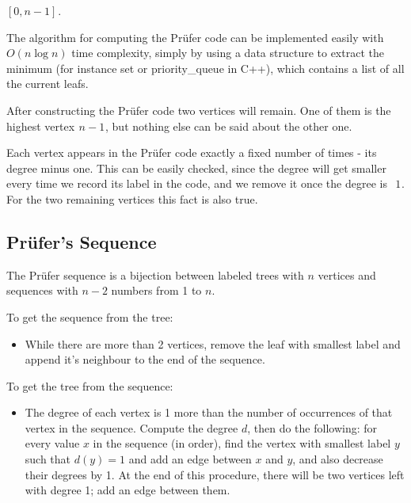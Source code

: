$[0, n-1]$ .

The algorithm for computing the Prüfer code can be implemented easily with  
$O(n \log n)$ time complexity, simply by using a data structure to extract the minimum (for instance set or priority\_queue in C++), which contains a list of all the current leafs.

After constructing the Prüfer code two vertices will remain. One of them is the highest vertex  $n-1$ , but nothing else can be said about the other one.

Each vertex appears in the Prüfer code exactly a fixed number of times - its degree minus one. This can be easily checked, since the degree will get smaller every time we record its label in the code, and we remove it once the degree is  
$1$ . For the two remaining vertices this fact is also true.

\subsection{Prüfer's Sequence}
The Prüfer sequence is a bijection between labeled trees with $n$ vertices and sequences with $n-2$ numbers from 1 to $n$.

To get the sequence from the tree:

\begin{itemize}
    \item While there are more than 2 vertices, remove the leaf with smallest label and append it's neighbour to the end of the sequence.
\end{itemize}

To get the tree from the sequence:

\begin{itemize}
    \item The degree of each vertex is 1 more than the number of occurrences of that vertex in the sequence. Compute the degree $d$, then do the following: for every value $x$ in the sequence (in order), find the vertex with smallest label $y$ such that $d(y) = 1$ and add an edge between $x$ and $y$, and also decrease their degrees by 1. At the end of this procedure, there will be two vertices left with degree 1; add an edge between them.
\end{itemize}




